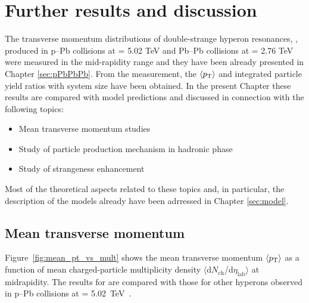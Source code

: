 \newpage
\section{Further results and discussion}
The transverse momentum distributions of double-strange hyperon resonances, \xis, produced in p--Pb collisions at \snn = 5.02 TeV and Pb--Pb collisions at \snn = 2.76 TeV were measured in the mid-rapidity range and they have been already presented in Chapter \ref{sec:pPbPbPb}. From the measurement, the $\langle p_{\mathrm{T}}\rangle$ and integrated particle yield ratios with system size have been obtained. In the present Chapter these results are compared with model predictions and discussed in connection with the following topics: 

\begin{itemize}
\item Mean transverse momentum studies
\item Study of particle production mechanism in hadronic phase
\item Study of strangeness enhancement
\end{itemize}

Most of the theoretical aspects related to these topics and, in particular, the description of the models already have been adrressed in Chapter \ref{sec:model}.




\subsection{Mean transverse momentum}

Figure~\ref{fig:mean_pt_vs_mult} shows the mean transverse momentum $\langle p_{\mathrm{T}}\rangle$ as a function of mean 
charged-particle multiplicity density $\langle$d$N_{\mathrm{ch}}$/d$\eta_{\mathrm{lab}}\rangle$ at midrapidity.
The results for \xis are compared with those for other hyperons observed in p--Pb collisions at \snn = 5.02~TeV~\cite{cite:lambda_pPb, cite:Xi_pPb}.

